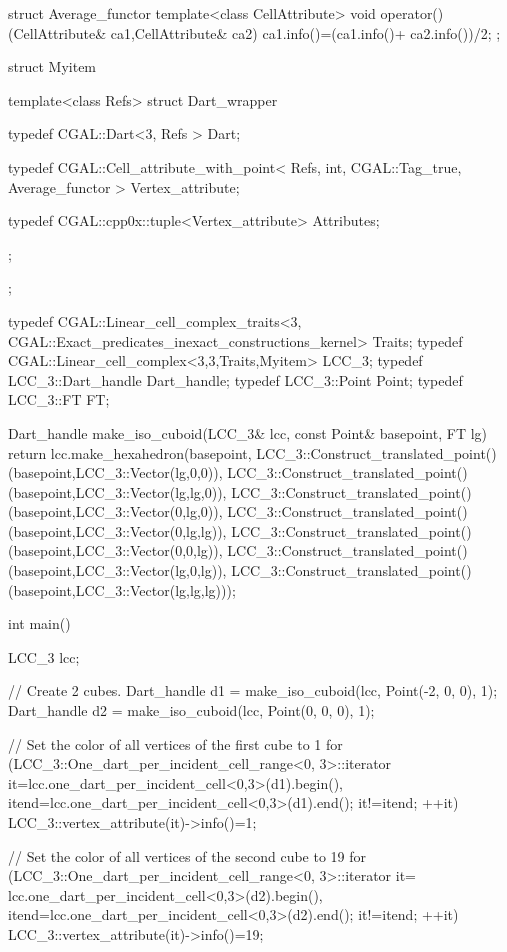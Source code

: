 \begin{ccExampleCode}
struct Average_functor
{
  template<class CellAttribute>
  void operator()(CellAttribute& ca1,CellAttribute& ca2)
  { ca1.info()=(ca1.info()+ ca2.info())/2; }
};

struct Myitem
{
  template<class Refs>
  struct Dart_wrapper
  {
    typedef CGAL::Dart<3, Refs > Dart;
    
    typedef CGAL::Cell_attribute_with_point< Refs, int, CGAL::Tag_true, 
                                   Average_functor > Vertex_attribute;
    
    typedef CGAL::cpp0x::tuple<Vertex_attribute> Attributes;
  };
};

typedef CGAL::Linear_cell_complex_traits<3,
         CGAL::Exact_predicates_inexact_constructions_kernel> Traits;
typedef CGAL::Linear_cell_complex<3,3,Traits,Myitem> LCC_3;
typedef LCC_3::Dart_handle                           Dart_handle;
typedef LCC_3::Point                                 Point;
typedef LCC_3::FT                                    FT;

Dart_handle make_iso_cuboid(LCC_3& lcc, const Point& basepoint, FT lg)
{
	return lcc.make_hexahedron(basepoint,
             LCC_3::Construct_translated_point()
                (basepoint,LCC_3::Vector(lg,0,0)),
             LCC_3::Construct_translated_point()
                (basepoint,LCC_3::Vector(lg,lg,0)),
             LCC_3::Construct_translated_point()
                (basepoint,LCC_3::Vector(0,lg,0)),
             LCC_3::Construct_translated_point()
                (basepoint,LCC_3::Vector(0,lg,lg)),
             LCC_3::Construct_translated_point()
                (basepoint,LCC_3::Vector(0,0,lg)),
             LCC_3::Construct_translated_point()
                (basepoint,LCC_3::Vector(lg,0,lg)),
             LCC_3::Construct_translated_point()
                (basepoint,LCC_3::Vector(lg,lg,lg)));
}

int main()
{
  LCC_3 lcc;
  
  // Create 2 cubes.
  Dart_handle d1 = make_iso_cuboid(lcc, Point(-2, 0, 0), 1);
  Dart_handle d2 = make_iso_cuboid(lcc, Point(0, 0, 0), 1);

  // Set the color of all vertices of the first cube to 1
  for (LCC_3::One_dart_per_incident_cell_range<0, 3>::iterator 
       it=lcc.one_dart_per_incident_cell<0,3>(d1).begin(), 
       itend=lcc.one_dart_per_incident_cell<0,3>(d1).end(); 
       it!=itend; ++it)
    { LCC_3::vertex_attribute(it)->info()=1; }
  
  // Set the color of all vertices of the second cube to 19
  for (LCC_3::One_dart_per_incident_cell_range<0, 3>::iterator it=
       lcc.one_dart_per_incident_cell<0,3>(d2).begin(),
       itend=lcc.one_dart_per_incident_cell<0,3>(d2).end(); 
       it!=itend; ++it)
    { LCC_3::vertex_attribute(it)->info()=19; }
  
}
\end{ccExampleCode}
